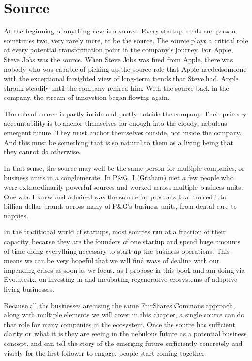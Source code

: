 \section{Source}
\label{section:source}


At the beginning of anything new is a source\cite{koenig-source}. Every startup needs one person, sometimes two, very rarely more, to be the source. The source plays a critical role at every potential transformation point in the company's journey. For Apple, Steve Jobs was the source. When Steve Jobs was fired from Apple,  there was nobody who was capable of picking up the source role that Apple needed\textemdash someone with the exceptional farsighted view of long-term trends that Steve had. Apple shrank steadily until the company rehired him. With the source back in the company, the stream of innovation began flowing again.


The role of source is partly inside and partly outside the company. Their primary accountability is to anchor themselves far enough into the cloudy, nebulous emergent future. They must anchor themselves outside, not inside the company. And this must be something that is so natural to them as a living being that they cannot do otherwise.


In that sense, the source may well be the same person for multiple companies, or business units in a conglomerate. In P\&G, I (Graham)  met a few people who were extraordinarily powerful sources and worked across multiple business units. One who I knew and admired was the source for products that turned into billion-dollar brands across many of P\&G's business units, from dental care to nappies.


In the traditional world of startups, most sources run at a fraction of their capacity, because they are the founders of one startup and spend huge amounts of time doing everything necessary to start up the business operations. This means we can be very hopeful that we will find ways of dealing with our impending crises as soon as we focus, as I propose in this book and am doing via Evolutesix,  on investing in and incubating regenerative ecosystems of adaptive living businesses.


Because all the businesses are using the same FairShares Commons  approach, along with multiple elements we will cover in this chapter, a single source can do that role for many companies in the ecosystem. Once the source has sufficient clarity on what it is they are seeing in the nebulous future as a potential business concept, and can tell the story of the emerging future sufficiently concretely and visibly for the first follower to engage, people start coming together. 


